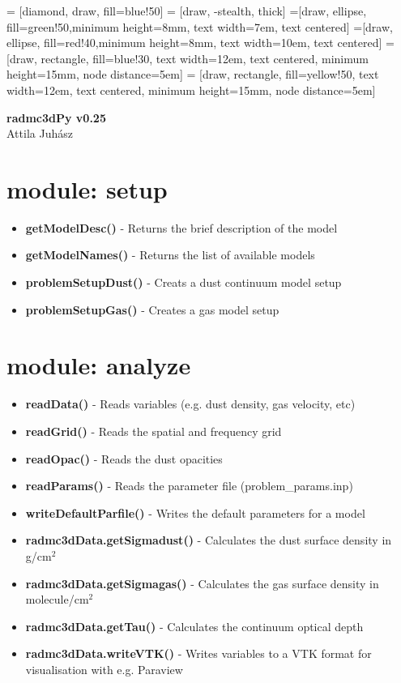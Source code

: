 \documentclass[12pt]{article}
\begin{document}
 = [diamond, draw, fill=blue!50]
 = [draw, -stealth, thick]
=[draw, ellipse, fill=green!50,minimum height=8mm, text width=7em, text centered]
=[draw, ellipse, fill=red!40,minimum height=8mm, text width=10em, text centered]
 = [draw, rectangle, fill=blue!30, text width=12em, text centered, minimum height=15mm, node distance=5em]
 = [draw, rectangle, fill=yellow!50, text width=12em, text centered, minimum height=15mm, node distance=5em]



\begin{center}
{\huge\bf radmc3dPy v0.25}\\
\vspace{0.5cm}
{\large Attila Juh\'asz}
\end{center}

\section*{module: setup}
\begin{itemize}
\item[] {\bf getModelDesc()} - Returns the brief description of the model
\item[] {\bf getModelNames()} - Returns the list of available models
\item[] {\bf problemSetupDust()} - Creats a dust continuum model setup
\item[] {\bf problemSetupGas()} - Creates a gas model setup
\end{itemize}

\section*{module: analyze}
\begin{itemize}
\item[]{\bf readData()} - Reads variables (e.g. dust density, gas velocity, etc)
\item[]{\bf readGrid()} - Reads the spatial and frequency grid
\item[]{\bf readOpac()} - Reads the dust opacities
\item[]{\bf readParams()} - Reads the parameter file (problem\_params.inp)
\item[]{\bf writeDefaultParfile()} - Writes the default parameters for a model
\item[]{\bf radmc3dData.getSigmadust()} - Calculates the dust surface density in g/cm$^2$
\item[]{\bf radmc3dData.getSigmagas()} - Calculates the gas surface density in molecule/cm$^2$
\item[]{\bf radmc3dData.getTau()} - Calculates the continuum optical depth 
\item[]{\bf radmc3dData.writeVTK()} - Writes variables to a VTK format for visualisation with e.g. Paraview 
\end{itemize}
\end{document}
